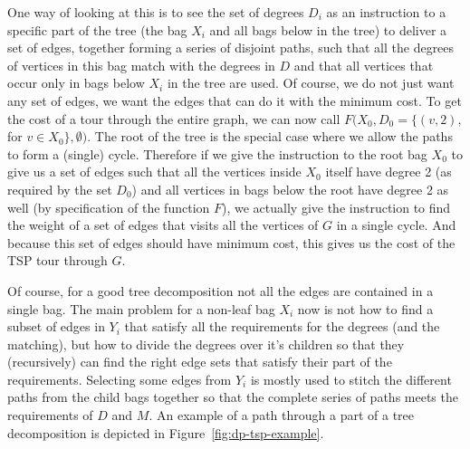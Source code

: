 \documentclass[titlepage, 12pt]{article}
\begin{document}
    One way of looking at this is to see the set of degrees $D_i$ as an instruction to a specific
    part of the tree (the bag $X_i$ and all bags below in the tree) to deliver a set of edges,
    together forming a series of disjoint paths, such that all the degrees of vertices in this bag
    match with the degrees in $D$ and that all vertices that occur only in bags below $X_i$ in the
    tree are used.
    Of course, we do not just want any set of edges, we want the edges that can do it with the
    minimum cost. To get the cost of a tour through the entire graph, we can now call
    $F(X_0, D_0=\{(v, 2),$ for $v \in X_0\}, \emptyset)$. The root of the tree is the special case
    where we allow the paths to form a (single) cycle. Therefore if we give the instruction to the
    root bag $X_0$ to give us a set of edges such that all the vertices inside $X_0$ itself have
    degree 2 (as required by the set $D_0$) and all vertices in bags below the root have degree 2 as
    well (by specification of the function $F$), we actually give the instruction to find the weight
    of a set of edges that visits all the vertices of $G$ in a single cycle. And because this set of
    edges should have minimum cost, this gives us the cost of the TSP tour through $G$.

    Of course, for a good tree decomposition not all the edges are contained in a single bag. The
    main problem for a non-leaf bag $X_i$ now is not how to find a subset of edges in $Y_i$ that
    satisfy all the requirements for the degrees (and the matching), but how to divide the degrees
    over it's children so that they (recursively) can find the right edge sets that satisfy their
    part of the requirements. Selecting some edges from $Y_i$ is mostly used to stitch the different
    paths from the child bags together so that the complete series of paths meets the requirements
    of $D$ and $M$.
    An example of a path through a part of a tree decomposition is depicted in
    Figure~\ref{fig:dp-tsp-example}.
\end{document}
